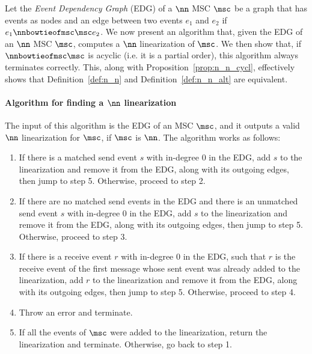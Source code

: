 Let the \emph{Event Dependency Graph} (EDG) of a $\nn$ MSC $\msc$ be a graph that has events as nodes and an edge between two events $e_1$ and $e_2$ if $e_1 \nnbowtieofmsc\msc e_2$. We now present an algorithm that, given the EDG of an $\nn$ MSC $\msc$, computes a $\nn$ linearization of $\msc$. We then show that, if $\nnbowtieofmsc\msc$ is acyclic (i.e. it is a partial order), this algorithm always terminates correctly. This, along with Proposition~\ref{prop:n_n_cycl}, effectively shows that Definition~\ref{def:n_n} and Definition~\ref{def:n_n_alt} are equivalent.

\paragraph*{Algorithm for finding a $\nn$ linearization}
The input of this algorithm is the EDG of an MSC $\msc$, and it outputs a valid $\nn$ linearization for $\msc$, if $\msc$ is $\nn$. The algorithm works as follows:
\begin{enumerate}
	\item If there is a matched send event $s$ with in-degree 0 in the EDG, add $s$ to the linearization and remove it from the EDG, along with its outgoing edges, then jump to step 5. Otherwise, proceed to step 2.
	\item If there are no matched send events in the EDG and there is an unmatched send event $s$ with in-degree 0 in the EDG, add $s$ to the linearization and remove it from the EDG, along with its outgoing edges, then jump to step 5. Otherwise, proceed to step 3.
 	\item If there is a receive event $r$ with in-degree 0 in the EDG, such that $r$ is the receive event of the first message whose sent event was already added to the linearization, add $r$ to the linearization and remove it from the EDG, along with its outgoing edges, then jump to step 5. Otherwise, proceed to step 4.
   	\item Throw an error and terminate.
   	\item If all the events of $\msc$ were added to the linearization, return the linearization and terminate. Otherwise, go back to step 1.
\end{enumerate}


